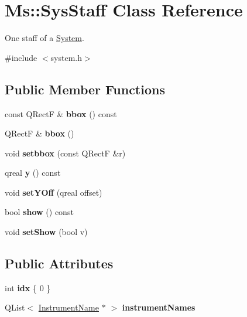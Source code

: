 \hypertarget{class_ms_1_1_sys_staff}{}\section{Ms\+:\+:Sys\+Staff Class Reference}
\label{class_ms_1_1_sys_staff}


One staff of a \hyperlink{class_ms_1_1_system}{System}.  




{\ttfamily \#include $<$system.\+h$>$}

\subsection*{Public Member Functions}
\begin{DoxyCompactItemize}
\item 
\mbox{\label{class_ms_1_1_sys_staff_aa79ca5523125cce73baf2b3783d0dd32}} 
const Q\+RectF \& {\bfseries bbox} () const
\item 
\mbox{\label{class_ms_1_1_sys_staff_a7d47cf06dbb343d498a5884b3ee8228e}} 
Q\+RectF \& {\bfseries bbox} ()
\item 
\mbox{\label{class_ms_1_1_sys_staff_a692ae62e28e29f1805aeea594ac05c2e}} 
void {\bfseries setbbox} (const Q\+RectF \&r)
\item 
\mbox{\label{class_ms_1_1_sys_staff_aee9868a0f2bc566af571f4fd377d6741}} 
qreal {\bfseries y} () const
\item 
\mbox{\label{class_ms_1_1_sys_staff_ae236fd1518ee5cca88f13e982e7ec45a}} 
void {\bfseries set\+Y\+Off} (qreal offset)
\item 
\mbox{\label{class_ms_1_1_sys_staff_a15edb8450b4cbf7ec4c20591804def65}} 
bool {\bfseries show} () const
\item 
\mbox{\label{class_ms_1_1_sys_staff_a57e339125410bd2815b37f3a294e3ea0}} 
void {\bfseries set\+Show} (bool v)
\end{DoxyCompactItemize}
\subsection*{Public Attributes}
\begin{DoxyCompactItemize}
\item 
\mbox{\label{class_ms_1_1_sys_staff_a3d89b75494765c309099e0c49ea4683d}} 
int {\bfseries idx} \{ 0 \}
\item 
\mbox{\label{class_ms_1_1_sys_staff_a973325c935602c6e6cc4d925293b84f1}} 
Q\+List$<$ \hyperlink{class_ms_1_1_instrument_name}{Instrument\+Name} $\ast$ $>$ {\bfseries instrument\+Names}
\end{DoxyCompactItemize}



